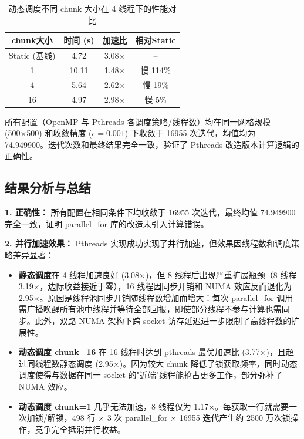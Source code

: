 \documentclass{SYSUReport}
\begin{document}
\begin{table}[h!]
\centering
\caption{动态调度不同 chunk 大小在 4 线程下的性能对比}
\begin{tabular}{|c|c|c|c|}
\hline
\textbf{chunk大小} & \textbf{时间 (s)} & \textbf{加速比} & \textbf{相对Static} \\
\hline
Static (基线) & 4.72 & 3.08× & -- \\
1 & 10.11 & 1.48× & 慢 114\% \\
4 & 5.64 & 2.62× & 慢 19\% \\
16 & 4.97 & 2.98× & 慢 5\% \\
\hline
\end{tabular}
\label{tab:chunk_comparison}
\end{table}

所有配置（OpenMP 与 Pthreads 各调度策略/线程数）均在同一网格规模 (500×500) 和收敛精度 ($\epsilon=0.001$) 下收敛于 16955 次迭代，均值均为 74.949900。迭代次数和最终结果完全一致，验证了 Pthreads 改造版本计算逻辑的正确性。

\newpage
\subsection{结果分析与总结}

\textbf{1. 正确性：} 所有配置在相同条件下均收敛于 16955 次迭代，最终均值 74.949900 完全一致，证明 parallel\_for 库的改造未引入计算错误。

\textbf{2. 并行加速效果：} Pthreads 实现成功实现了并行加速，但效果因线程数和调度策略差异显著：
\begin{itemize}
    \item \textbf{静态调度}在 4 线程加速良好 (3.08×)，但 8 线程后出现严重扩展瓶颈（8 线程 3.19×，边际收益接近于零），16 线程因同步开销和 NUMA 效应反而退化为 2.95×。原因是线程池同步开销随线程数增加而增大：每次 parallel\_for 调用需广播唤醒所有池中线程并等待全部回报，即使部分线程不参与计算也需同步。此外，双路 NUMA 架构下跨 socket 访存延迟进一步限制了高线程数的扩展性。
    \item \textbf{动态调度 chunk=16} 在 16 线程时达到 pthreads 最优加速比 (3.77×)，且超过同线程数静态调度 (2.95×)。因为较大 chunk 降低了锁获取频率，同时动态调度使得与数据在同一 socket 的"近端"线程能抢占更多工作，部分弥补了 NUMA 效应。
    \item \textbf{动态调度 chunk=1} 几乎无法加速，8 线程仅为 1.17×。每获取一行就需要一次加锁/解锁，498 行 × 3 次 parallel\_for × 16955 迭代产生约 2500 万次锁操作，竞争完全抵消并行收益。
\end{itemize}
\end{document}
